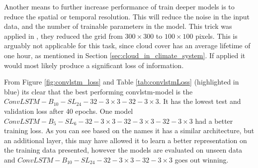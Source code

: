 Another means to further increase performance of train deeper models is to reduce the spatial or temporal resolution. This will reduce the noise in the input data, and the number of trainable parameters in the model. This trick was applied in , they reduced the grid from $300\times300$ to $100\times100$ pixels. This is arguably not applicable for this task, since cloud cover has an average lifetime of one hour, as mentioned in Section \ref{sec:cloud_in_climate_system}. If applied it would most likely produce a significant loss of information.


From Figure \ref{fig:convlstm_loss} and Table \ref{tab:convlstmLoss} (highlighted in blue) its clear that the best performing \acrshort{convlstm}-model is the $ConvLSTM-B_{10}-SL_{24}-32-3\times3-32-3 \times3$. It has the lowest test and validation loss after 40 epochs. One model $ConvLSTM-B_{5}-SL_{6}-32-3\times3-32-3 \times3-32-3 \times3$ had a better training loss. As you can see based on the names it has a similar architecture, but an additional layer, this may have allowed it to learn a better representation on the training data presented, however the models are evaluated on unseen data and $ConvLSTM-B_{10}-SL_{24}-32-3\times3-32-3 \times3$ goes out winning.

